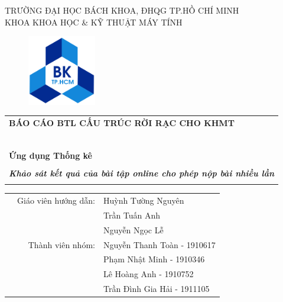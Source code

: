\documentclass[12pt,a4paper]{article}  %
\begin{document}
 
\begin{titlepage}

	\begin{center}
	TRƯỜNG ĐẠI HỌC BÁCH KHOA, ĐHQG TP.HỒ CHÍ MINH\\
	KHOA KHOA HỌC \& KỸ THUẬT MÁY TÍNH
	\end{center}
	
	\vspace{1cm}
	
	\begin{figure}[h!]
	\begin{center}
	\includegraphics[width=3cm]{hcmut.png}
	\end{center}
	\end{figure}
	
	\vspace{1cm}
	
	
	\begin{center}
	\begin{tabular}{c}
	\multicolumn{1}{l}{\textbf{{\Large BÁO CÁO BTL CẤU TRÚC RỜI RẠC CHO KHMT}}}\\
	~~\\
	\hline
	\\
	\multicolumn{1}{l}{\textbf{{\Large Ứng dụng Thống kê}}}\\
	\\
	\textbf{\normalsize \textit{ Khảo sát kết quả của bài tập online cho phép nộp bài nhiều lần}}\\
	\\
	\hline
	\end{tabular}
	\end{center}
	
	\vspace{3cm}
	
	\begin{table}[h]
	\begin{tabular}{rrl}
	
	\hspace{4 cm} & Giáo viên hướng dẫn: & Huỳnh Tường Nguyên\\
	& & Trần Tuấn Anh \\
	& & Nguyễn Ngọc Lễ  \\
	& Thành viên nhóm: & Nguyễn Thanh Toàn - 1910617 \\
	& & Phạm Nhật Minh - 1910346 \\
	& & Lê Hoàng Anh - 1910752 \\
	& & Trần Đình Gia Hải - 1911105 \\
	

\end{tabular}
\end{table}
\end{titlepage}
\end{document}
